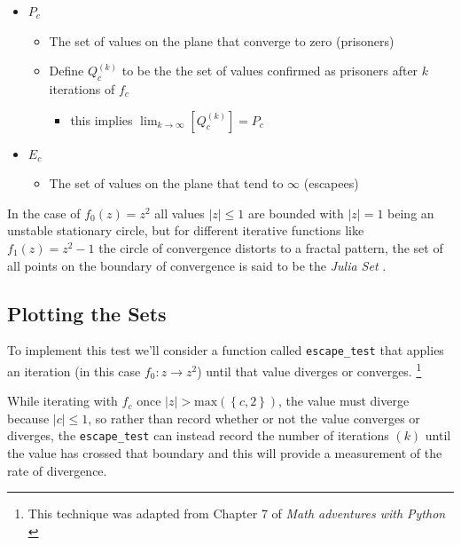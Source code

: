 \documentclass[a4paper,11pt,twoside]{article}
\begin{document}
\begin{itemize}
\item \(P_{c}\)
\begin{itemize}
\item The set of values on the plane that converge to zero (prisoners)
\item Define \(Q^{(k)}_{c}\) to be the the set of values confirmed as prisoners after \(k\) iterations of \(f_{c}\)
\begin{itemize}
\item this implies \(\lim_{k \rightarrow \infty} \left[ Q^{(k)}_{c}  \right] = P_{c}\)
\end{itemize}
\end{itemize}
\item \(E_{c}\)
\begin{itemize}
\item The set of values on the plane that tend to \(\infty\) (escapees)
\end{itemize}
\end{itemize}

In the case of \(f_{0}(z) = z^{2}\) all values \(\left\lvert z  \right \rvert \leq 1\) are bounded with \(\left\lvert z  \right \rvert = 1\) being an unstable stationary circle, but for different iterative functions like \(f_{1}(z) = z^{2} - 1\) the circle of convergence distorts to a fractal pattern, the set of all points on the boundary of convergence is said to be the \emph{Julia Set} \cite[Ch. 14]{peitgenChaosFractalsNew2004}.

\subsection{Plotting the Sets}
\label{sec:org261f666}
To implement this test we'll consider a function called \texttt{escape\_test} that applies an
iteration (in this case \(f_{0}: z \rightarrow z^{2}\)) until that value diverges or converges. \footnote{This technique was adapted from Chapter 7 of \emph{Math adventures with Python} \cite{farrellMathAdventuresPython2019}}

While iterating with \(f_{c}\) once \(\left\lvert z \right\rvert >
\mathrm{max}\left(\left\{c, 2\right\}\right)\), the value must diverge because
\(\left\lvert c \right\rvert \leq 1\), so rather than record whether or not the
value converges or diverges, the \texttt{escape\_test} can instead record the number of
iterations \((k)\) until the value has crossed that boundary and this will provide
a measurement of the rate of divergence.
\end{document}
